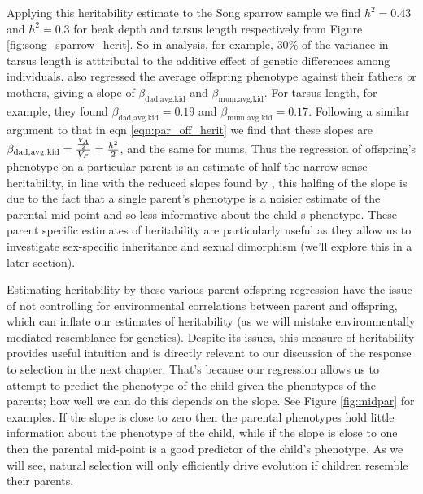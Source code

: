 Applying this heritability estimate to the Song sparrow sample we find
$h^2=0.43$ and $h^2=0.3$ for beak depth and tarsus length
respectively from Figure
\ref{fig:song_sparrow_herit}. So in \citet{smith1979heritability} analysis, for example,
$30\%$ of the variance in tarsus length is atttributal to the additive
effect of genetic
differences among individuals. 
\citet{smith1979heritability} also regressed the average offspring
phenotype against their fathers {\emph or} mothers,
giving a slope of $\beta_{\textrm{dad}, \textrm{avg.kid}}$ and
$\beta_{\textrm{mum}, \textrm{avg.kid}}$. For tarsus length, for
example, they found $\beta_{\textrm{dad},
  \textrm{avg.kid}}= 0.19$ and $\beta_{\textrm{mum},
  \textrm{avg.kid}}= 0.17$.  Following a similar argument to
that in eqn
\eqref{eqn:par_off_herit} we find that these slopes are $\beta_{\textrm{dad}, \textrm{avg.kid}}=
\nicefrac{\nicefrac{V_{A}}{2}}{V_P} = \nicefrac{h^2}{2}$, and the same
  for mums. Thus the regression of offspring's phenotype on a
  particular parent is an estimate of half the narrow-sense
  heritability, in line with the reduced slopes found by
  \citet{smith1979heritability}, this halfing of the slope is due to the
  fact that a single parent's phenotype is a noisier estimate of the
  parental mid-point and so less informative about the child
  s phenotype. These parent specific estimates of heritability are
  particularly useful as they allow us to investigate sex-specific inheritance and sexual
  dimorphism (we'll explore this in a later section). 



Estimating heritability by these various parent-offspring regression have the issue of not controlling for
environmental correlations between parent and offspring, which can
inflate our estimates of heritability (as we will mistake
environmentally mediated resemblance for genetics). Despite its issues, this measure of heritability provides useful
intuition and is directly relevant to our discussion of the response to selection in
the next chapter. That's because our regression allows us to attempt to predict the phenotype of the
child given the phenotypes of the parents; how well we can do this depends on the
slope. See Figure \ref{fig:midpar} for examples. If the slope is close
to zero then the parental phenotypes hold little
information about the phenotype of the child, while if the slope is
close to one then the parental mid-point is a good predictor of the child's
phenotype. As we will see, natural selection will only efficiently
drive evolution if children resemble their parents.\\


